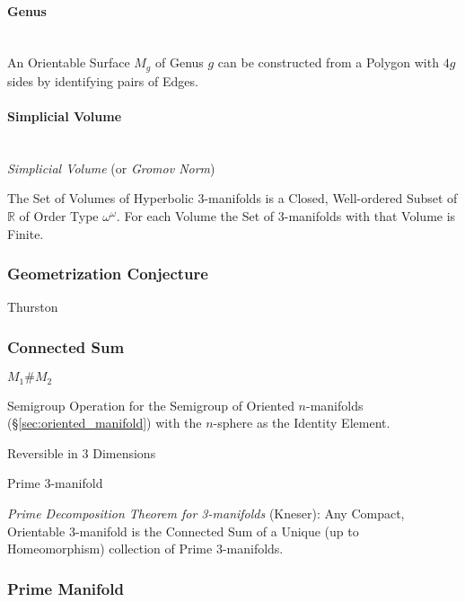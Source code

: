 \paragraph{Genus}\label{sec:genus}
\hfill \\

An Orientable Surface $M_g$ of Genus $g$ can be constructed from a
Polygon with $4g$ sides by identifying pairs of Edges.



\paragraph{Simplicial Volume}\label{sec:simplicial_volume}
\hfill \\

\emph{Simplicial Volume} (or \emph{Gromov Norm})

The Set of Volumes of Hyperbolic 3-manifolds is a Closed, Well-ordered
Subset of $\mathbb{R}$ of Order Type $\omega^\omega$. For each Volume
the Set of 3-manifolds with that Volume is Finite.



\subsubsection{Geometrization Conjecture}
\label{sec:geometrization_conjecture}

Thurston



\subsubsection{Connected Sum}\label{sec:connected_sum}

$M_1 \# M_2$

Semigroup Operation for the Semigroup of Oriented $n$-manifolds
(\S\ref{sec:oriented_manifold}) with the $n$-sphere as the Identity
Element.

Reversible in 3 Dimensions

Prime 3-manifold

\emph{Prime Decomposition Theorem for 3-manifolds} (Kneser): Any
Compact, Orientable 3-manifold is the Connected Sum of a Unique (up to
Homeomorphism) collection of Prime 3-manifolds.



\subsubsection{Prime Manifold}\label{sec:prime_manifold}



